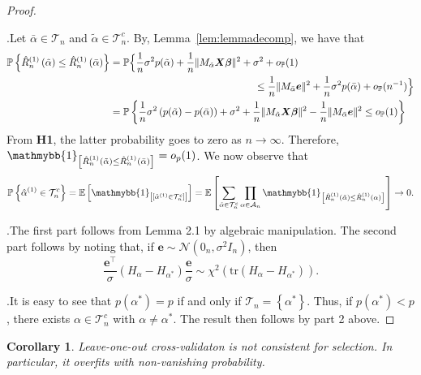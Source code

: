 \documentclass[12pt, letter paper]{article}
\newcommand{\1}{\mathmybb{1}}
\newtheorem{corollary}[proposition]{Corollary}
\newcommand{\0}{\emptyset}
\newcommand{\prob}{\mathbb{P}}
\newcommand{\Ep}[1]{\mathbb{E}\left[ #1 \right]}
\newcommand{\paren}[1]{\left(#1 \right)}
\newcommand{\sqbr}[1]{\left[#1 \right]}
\newcommand{\set}[1]{\left\{ #1 \right\}}
\newcommand{\norm}[1]{|\hspace{-1pt}|#1 |\hspace{-1pt}|}
\newcommand{\normsq}[1]{\norm{#1}^{2}}
\newcommand{\ind}[1]{\mathmybb{1}_{\sqbr{#1}}}
\newcommand{\Acal}{\mathcal{A}_{n}}
\newcommand{\Tcal}{\mathcal{T}_{n}}
\newcommand{\Ncal}{\mathcal{N}}
\newcommand{\X}{\boldsymbol{X}}
\newcommand{\e}{\boldsymbol{e}}
\newcommand{\bbeta}{\boldsymbol{\beta}}
\newcommand{\alphahat}[1]{\hat{\alpha}^{#1}}
\newcommand{\alphatilde}{\tilde{\alpha}}
\newcommand{\alphabar}{\bar{\alpha}}
\newcommand{\loocv}[1]{\hat{R}^{(1)}_{n}\paren{#1}}
\begin{document}
\begin{proof}
    \(\)

    .\quad Let \(\alphabar\in \Tcal\) and \(\alphatilde\in\Tcal^{c}\). By, Lemma~\ref{lem:lemmadecomp}, we have that
    \begin{align*}
        \prob\set{\loocv{\alphatilde}\leq \loocv{\alphabar}} &= \prob\Big\{\frac{1}{n}\sigma^{2}p(\alphatilde) + \frac{1}{n}\normsq{M_{\alphatilde}\X\bbeta} + \sigma^{2} + o_{\prob}(1)\\
        &\hspace{2in} \leq \frac{1}{n}\normsq{M_{\alphabar}\e} + \frac{1}{n}\sigma^{2}p(\alphabar) + o_{\prob}(n^{-1})\Big\}\\
        &= \prob\set{\frac{1}{n}\sigma^{2}\paren{p(\alphatilde) - p(\alphabar)} + \sigma^{2} + \frac{1}{n}\normsq{M_{\alphatilde}\X\bbeta} - \frac{1}{n}\normsq{M_{\alphabar}\e}\leq o_{\prob}(1)}
    \end{align*}
    From \textbf{H1}, the latter probability goes to zero as \(n\to\infty\). Therefore, \(\ind{\loocv{\alphatilde}\leq \loocv{\alphabar}} = o_{p}(1)\). We now observe that
    \[\prob\set{\alphahat{(1)}\in\Tcal^{c}} = \Ep{\ind{[\alphahat{(1)}\in\Tcal^{c}]}} = \Ep{\sum_{\alphatilde\in\Tcal^{c}}\prod_{\alpha\in\Acal} \ind{\loocv{\alphatilde}\leq \loocv{\alpha}}} \to 0.\]

    .\quad The first part follows from Lemma 2.1 by algebraic manipulation. The second part follows by noting that, if \(\e\sim\Ncal(0_{n}, \sigma^{2}I_{n})\), then \[\frac{\e^{\top}}{\sigma}\paren{H_{\alpha} - H_{\alpha^{*}}}\frac{\e}{\sigma}\sim\chi^{2}\paren{\mathrm{tr}\paren{H_{\alpha}-H_{\alpha^{*}}}}.\]

    .\quad It is easy to see that \(p(\alpha^{*}) = p\) if and only if \(\Tcal=\set{\alpha^{*}}\). Thus, if \(p(\alpha^{*}) < p\), there exists \(\alpha\in\Tcal^{c}\) with \(\alpha\neq \alpha^{*}\). The result then follows by part 2 above.
\end{proof}

\begin{corollary}
    Leave-one-out cross-validaton is not consistent for selection. In particular, it overfits with non-vanishing probability.
\end{corollary}

\end{document}
